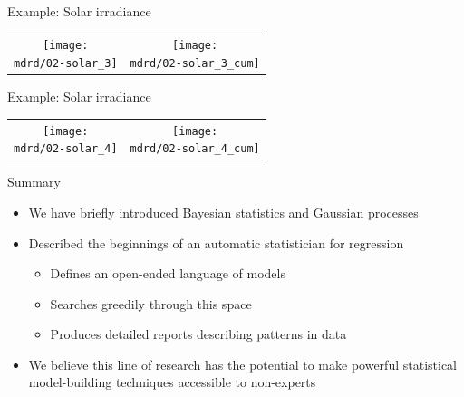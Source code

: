 \begin{frame}{Example: Solar irradiance}
\newcommand{\wmgd}{0.5\columnwidth}
\newcommand{\hmgd}{3.0cm}
\newcommand{\mdrd}{figures/02-solar}
\newcommand{\mbm}{\hspace{-0.3cm}}
{\footnotesize

}

\vspace{\baselineskip}

\begin{tabular}{cc}
\mbm \texttt{[image: \\mdrd/02-solar\_3]} & \texttt{[image: \\mdrd/02-solar\_3\_cum]}
\end{tabular}
\end{frame}

\begin{frame}{Example: Solar irradiance}
\newcommand{\wmgd}{0.5\columnwidth}
\newcommand{\hmgd}{3.0cm}
\newcommand{\mdrd}{figures/02-solar}
\newcommand{\mbm}{\hspace{-0.3cm}}
{\footnotesize

}

\vspace{\baselineskip}

\begin{tabular}{cc}
\mbm \texttt{[image: \\mdrd/02-solar\_4]} & \texttt{[image: \\mdrd/02-solar\_4\_cum]}
\end{tabular}
\end{frame}

\begin{frame}{Summary}
  \begin{itemize}
    \item We have briefly introduced Bayesian statistics and Gaussian processes
    \vspace{\baselineskip}
    \item Described the beginnings of an automatic statistician for regression
    \begin{itemize}
      \item Defines an open-ended language of models
      \item Searches greedily through this space
      \item Produces detailed reports describing patterns in data
    \end{itemize}
    \vspace{\baselineskip}
    \item We believe this line of research has the potential to make powerful statistical model-building techniques accessible to non-experts
  \end{itemize}
\end{frame}

